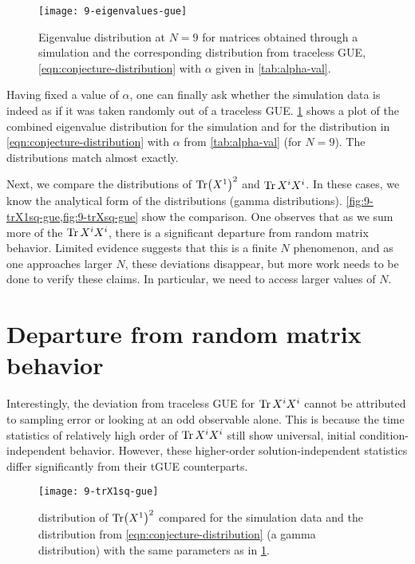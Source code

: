 \begin{figure}[H]
    \centering
    \texttt{[image: 9-eigenvalues-gue]}
    \caption{Eigenvalue distribution at $N = 9$ for matrices obtained through a simulation and the corresponding distribution from traceless GUE, \cref{eqn:conjecture-distribution} with $\alpha$ given in \cref{tab:alpha-val}.}
    \label{fig:9-eigenvalues-gue}
\end{figure}

Having fixed a value of $\alpha$, one can finally ask whether the simulation data is indeed as if it was taken randomly out of a traceless GUE. \cref{fig:9-eigenvalues-gue} shows a plot of the combined eigenvalue distribution for the simulation and for the distribution in \cref{eqn:conjecture-distribution} with $\alpha$ from \cref{tab:alpha-val} (for $N = 9$). The distributions match almost exactly.

Next, we compare the distributions of $\Tr (X^1)^2$ and $\Tr X^i X^i$. In these cases, we know the analytical form of the distributions (gamma distributions). \cref{fig:9-trX1sq-gue,fig:9-trXsq-gue} show the comparison. One observes that as we sum more of the $\Tr X^i X^i$, there is a significant departure from random matrix behavior. Limited evidence suggests that this is a finite $N$ phenomenon, and as one approaches larger $N$, these deviations disappear, but more work needs to be done to verify these claims. In particular, we need to access larger values of $N$. 

\section{Departure from random matrix behavior}

Interestingly, the deviation from traceless GUE for $\Tr X^i X^i$ cannot be attributed to sampling error or looking at an odd observable alone. This is because the time statistics of relatively high order of $\Tr X^i X^i$ still show universal, initial condition-independent behavior. However, these higher-order solution-independent statistics differ significantly from their tGUE counterparts. 

\begin{figure}[H]
    \centering
    \texttt{[image: 9-trX1sq-gue]}
    \caption{distribution of $\Tr (X^1)^2$ compared for the simulation data and the distribution from \cref{eqn:conjecture-distribution} (a gamma distribution) with the same parameters as in \cref{fig:9-eigenvalues-gue}.}
    \label{fig:9-trX1sq-gue}
\end{figure}


